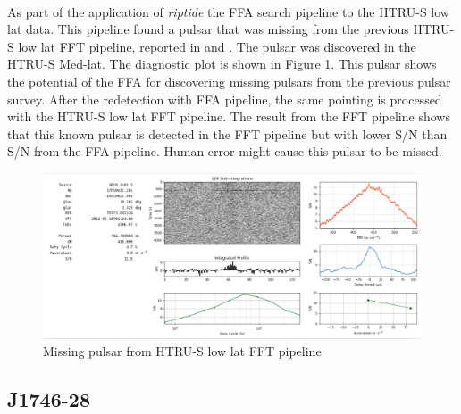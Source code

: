 \documentclass[thesis_msc.tex]{subfiles}
\begin{document}
   \paragraph{} As part of the application of \textit{riptide} the FFA search pipeline to the HTRU-S low lat data. This pipeline found a pulsar that was missing from the previous HTRU-S low lat FFT pipeline, reported in \citep{Andrew} and \citep{Ng}. The pulsar was discovered in the HTRU-S Med-lat. The diagnostic plot is shown in Figure \ref{missing}. This pulsar shows the potential of the FFA for discovering missing pulsars from the previous pulsar survey. After the redetection with FFA pipeline, the same pointing is processed with the HTRU-S low lat FFT pipeline. The result from the FFT pipeline shows that this known pulsar is detected in the FFT pipeline but with lower S/N than S/N from the FFA pipeline. Human error might cause this pulsar to be missed.  
       \begin{figure}[h]
\centering
\includegraphics[width=1.0\textwidth]{figures/missing.png}
\caption{Missing pulsar from HTRU-S low lat FFT pipeline}\label{missing}
\end{figure}

    \subsection{J1746-28}
\end{document}
